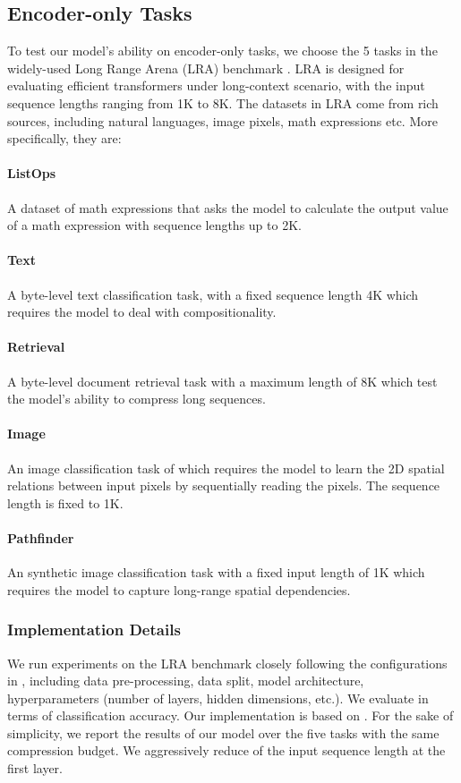 \documentclass[11pt]{article}
\begin{document}
\subsection{Encoder-only Tasks}  \label{sec: lra}
To test our model's ability on encoder-only tasks, we choose the 5 tasks in the widely-used Long Range Arena (LRA) benchmark \citep{tay2020long}. LRA is designed for evaluating efficient transformers under long-context scenario, with the input sequence lengths ranging from 1K to 8K. The datasets in LRA come from rich sources, including natural languages, image pixels, math expressions etc. More specifically, they are:
\paragraph{ListOps} A dataset of math expressions that asks the model to calculate the output value of a math expression with sequence lengths up to 2K.
\paragraph{Text} A byte-level text classification task, with a fixed sequence length 4K which requires the model to deal with compositionality.
\paragraph{Retrieval} A byte-level document retrieval task with a maximum length of 8K which test the model's ability to compress long sequences.
\paragraph{Image} An image classification task of which requires the model to learn the 2D spatial relations between input pixels by sequentially reading the pixels. The sequence length is fixed to 1K.
\paragraph{Pathfinder} An synthetic image classification task with a fixed input length of 1K which requires the model to capture long-range spatial dependencies.

\subsubsection{Implementation Details}
\label{sec: enc imp details}
We run experiments on the LRA benchmark closely following the configurations in \citep{tay2020long}, including data pre-processing, data split, model architecture, hyperparameters (number of layers, hidden dimensions, etc.). We evaluate in terms of classification accuracy. Our implementation is based on \citep{xiong2021nystromformer}. For the sake of simplicity, we report the results of our model over the five tasks with the same compression budget. We aggressively reduce  of the input sequence length at the first layer. 
\end{document}
